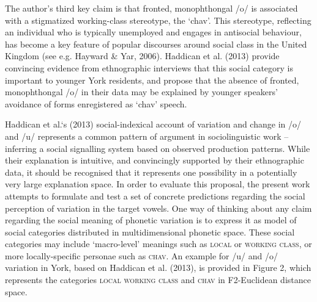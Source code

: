 \documentclass[PWPL]{article}
\begin{document}
The author's third key claim is that fronted, monophthongal /o/ is associated with a stigmatized working-class stereotype, the `chav'. This stereotype, reflecting an individual who is typically unemployed and engages in antisocial behaviour, has become a key feature of popular discourses around social class in the United Kingdom (see e.g. Hayward \& Yar, 2006). Haddican et al. (2013) provide convincing evidence from ethnographic interviews that this social category is important to younger York residents, and propose that the absence of fronted, monophthongal /o/ in their data may be explained by younger speakers' avoidance of forms enregistered as `chav' speech. 

Haddican et al.`s (2013) social-indexical account of variation and change in /o/ and /u/ represents a common pattern of argument in sociolinguistic work -- inferring a social signalling system based on observed production patterns. While their explanation is intuitive, and convincingly supported by their ethnographic data, it should be recognised that it represents one possibility in a potentially very large explanation space. In order to evaluate this proposal, the present work attempts to formulate and test a set of concrete predictions regarding the social perception of variation in the target vowels. One way of thinking about any claim regarding the social meaning of phonetic variation is to express it as model of social categories distributed in multidimensional phonetic space. These social categories may include `macro-level' meanings such as \textsc{local} or \textsc{working class}, or more locally-specific personae such as \textsc{chav}. An example for /u/ and /o/ variation in York, based on Haddican et al. (2013), is provided in Figure 2, which represents the categories \textsc{local} \textsc{working class} and \textsc{chav} in F2-Euclidean distance space.
\end{document}
